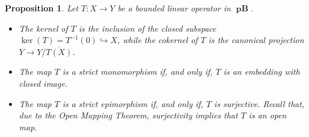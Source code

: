 \documentclass[12pt,a4paper]{amsproc}
\newtheorem{prop}[thm]{Proposition}
\theoremstyle{remark}
\theoremstyle{definition}
\newcommand{\pBan}{\operatorname{\textbf{pB}}}
\numberwithin{equation}{section}
\begin{document}
\begin{prop}\label{prop:pban_quasi_abelian}
Let $T: X \to Y$ be a bounded linear operator in $\boldsymbol{\pBan}$.
\begin{itemize}
    \item[\emph{i)}] The kernel of $T$ is the inclusion of the closed subspace $\ker(T) = T^{-1}(0) \hookrightarrow X$, while the cokernel of $T$ is the canonical projection $Y \to Y / \overline{T(X)}$.
    \item[\emph{ii)}] The map $T$ is a \emph{strict monomorphism} if, and only if, $T$ is an embedding with closed image.
    \item[\emph{iii)}] The map $T$ is a \emph{strict epimorphism} if, and only if, $T$ is surjective. Recall that, due to the Open Mapping Theorem, surjectivity implies that $T$ is an open map.
\end{itemize}
\end{prop}
\end{document}
